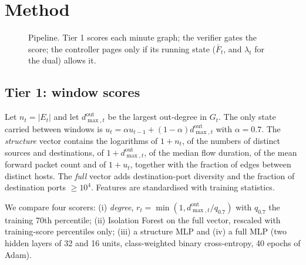 \documentclass[journal,10pt,twocolumn]{IEEEtran}
\begin{document}
\section{Method}
\begin{figure}[t]
\centering
{}
\caption{Pipeline. Tier 1 scores each minute graph; the verifier gates the score; the controller pages only if its running state ($\bar F_t$, and $\lambda_t$ for the dual) allows it.}
\label{fig:arch}
\end{figure}

\subsection{Tier 1: window scores}
Let $n_t=|E_t|$ and let $d^{\mathrm{out}}_{\max,t}$ be the largest out-degree in $G_t$. The only state carried between windows is $u_t=\alpha u_{t-1}+(1-\alpha)d^{\mathrm{out}}_{\max,t}$ with $\alpha=0.7$. The \emph{structure} vector contains the logarithms of $1+n_t$, of the numbers of distinct sources and destinations, of $1+d^{\mathrm{out}}_{\max,t}$, of the median flow duration, of the mean forward packet count and of $1+u_t$, together with the fraction of edges between distinct hosts. The \emph{full} vector adds destination-port diversity and the fraction of destination ports $\ge 10^4$. Features are standardised with training statistics.

We compare four scorers: (i) \emph{degree}, $r_t=\min(1,d^{\mathrm{out}}_{\max,t}/q_{0.7})$ with $q_{0.7}$ the training 70th percentile; (ii) Isolation Forest \cite{liu2008iforest} on the full vector, rescaled with training-score percentiles only; (iii) a structure MLP and (iv) a full MLP (two hidden layers of 32 and 16 units, class-weighted binary cross-entropy, 40 epochs of Adam).
\end{document}

